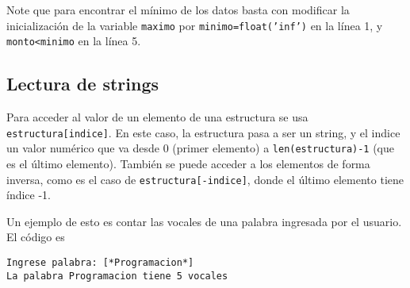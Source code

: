 Note que para encontrar el mínimo de los datos basta con modificar la inicialización de la variable \texttt{maximo} por \texttt{minimo=float('inf')} en la línea 1, y \texttt{monto<minimo} en la línea 5.

\subsection{Lectura de strings}

Para acceder al valor de un elemento de una estructura se usa \texttt{estructura[indice]}. En este caso, la estructura pasa a ser un string, y el indice un valor numérico que va desde 0 (primer elemento) a \texttt{len(estructura)-1} (que es el último elemento). También se puede acceder a los elementos de forma inversa, como es el caso de \texttt{estructura[-indice]}, donde el último elemento tiene índice -1.

Un ejemplo de esto es contar las vocales de una palabra ingresada por el usuario. El código es 

 

\begin{lstlisting}[style=consola]
Ingrese palabra: [*Programacion*]
La palabra Programacion tiene 5 vocales
\end{lstlisting}

